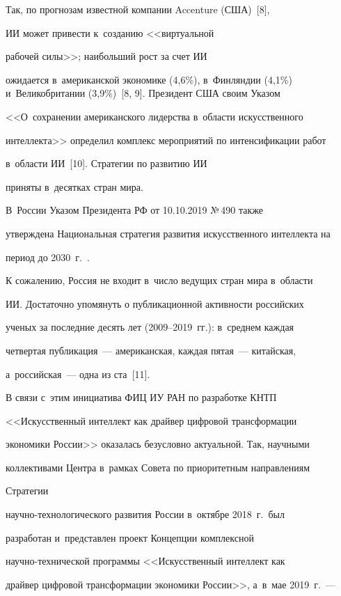     Так, по прогнозам известной компании Accenture (США)~[8], 

ИИ может привести к~созданию <<виртуальной 

рабочей силы>>; наибольший рост за счет ИИ

ожидается в~американской экономике (4,6\%), в~Финляндии (4,1\%) и~Великобритании (3,9\%)~[8, 9]. Президент США своим Указом 

<<О~сохранении американского лидерства в~области искусственного 

интеллекта>> определил комплекс мероприятий по интенсификации работ 

в~об\-ласти ИИ~[10]. Стратегии по развитию ИИ 

приняты в~десятках стран мира.

    

     В~России Указом Президента РФ от 10.10.2019 №\,490 также 

утверждена Национальная стратегия развития искусственного интеллекта на 

период до 2030~г.~\cite{9-zat}. 

    

     К сожалению, Россия не входит в~число ведущих стран мира в~области 

ИИ. Достаточно упомянуть о публикационной активности российских 

ученых за последние десять лет (2009--2019~гг.): в~среднем каждая 

четвертая публикация~--- американская, каждая пятая~--- китайская, 

а~российская~--- одна из ста~[11]. 

    

     В связи с~этим инициатива ФИЦ ИУ РАН по разработке КНТП 

<<Искусственный интеллект как драйвер цифровой трансформации 

экономики России>> оказалась безусловно актуальной. Так, научными 

коллективами Центра в~рамках Совета по приоритетным направлениям 

Стратегии  

на\-уч\-но-тех\-но\-ло\-ги\-че\-ско\-го развития России в~октябре 2018~г.\ был 

разработан и~представлен проект Концепции комплексной  

на\-уч\-но-тех\-ни\-че\-ской программы <<Искусственный интеллект как 

драйвер цифровой трансформации экономики России>>, а~в~мае 2019~г.~--- 

